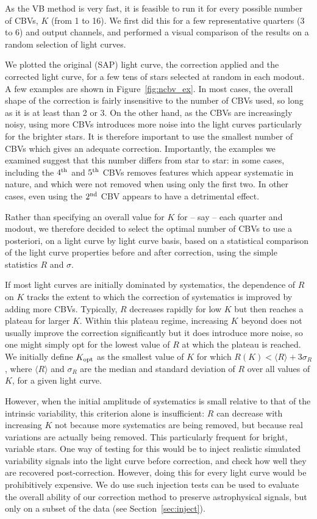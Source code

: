 \documentclass[useAMS,usenatbib]{mn2e}
\begin{document}
As the VB method is very fast, it is feasible to run it for every possible
number of CBVs, $K$ (from 1 to 16). We first did this for a few
representative quarters (3 to 6) and output
channels, and performed a visual comparison of the results on a random
selection of light curves. 

We plotted the original (SAP) light curve, the correction
applied and the corrected light curve, for a few tens of stars
selected at random in each modout. A few examples are shown in
Figure~\ref{fig:ncbv_ex}. In most cases, the overall
shape of the correction is fairly insensitive to the number of CBVs
used, so long as it is at least than 2 or 3. On the other hand, as the
CBVs are increasingly noisy, using more CBVs introduces more noise
into the light curves particularly for the brighter stars. It is
therefore important to use the smallest number of CBVs which gives an
adequate correction. Importantly, the examples we examined 
suggest that this number differs from star to star: in some cases,
including the $4^{\rm th}$ and $5^{\rm th}$ CBVs removes features
which appear systematic in nature, and which were not removed when
using only the first two. In other cases, even using the $2^{\rm nd}$ CBV
appears to have a detrimental effect.

Rather than specifying an overall value for $K$ for -- say -- each
quarter and modout, we therefore decided to select the optimal number
of CBVs to use a posteriori, on a light curve by light curve basis,
based on a statistical comparison of the light curve properties before
and after correction, using the simple statistics $R$ and $\sigma$. 

If most light curves are
initially dominated by systematics, the dependence of $R$ on $K$
tracks the extent to which the correction of systematics is improved
by adding more CBVs. Typically, $R$ decreases rapidly for low $K$ but
then reaches a plateau for larger $K$. Within this plateau regime, increasing
$K$ beyond does not usually improve the correction
significantly but it does introduce more noise, so one might simply
opt for the lowest value of $R$ at which the plateau is
reached. We initially define $K_{\rm opt}$ as the smallest value of $K$ for which $R(K)
< \langle R \rangle + 3 \sigma_R$, where $\langle R \rangle$ and
$\sigma_R$ are the median and standard deviation of $R$ over all
values of $K$, for a given light curve. 

However, when the initial amplitude of systematics is small relative
to that of the intrinsic variability, this criterion alone is
insufficient: $R$ can decrease with increasing $K$ not because more
systematics are being removed, but because real variations are
actually being removed. This particularly frequent for bright,
variable stars. One way of testing for this would be to inject
realistic simulated variability signals into the light curve before
correction, and check how well they are recovered
post-correction. However, doing this for every light curve would be
prohibitively expensive. We do use such injection tests can be used to
evaluate the overall ability of our correction method to preserve
astrophysical signals, but only on a subset of the data (see
Section~\ref{sec:inject}).
\end{document}
